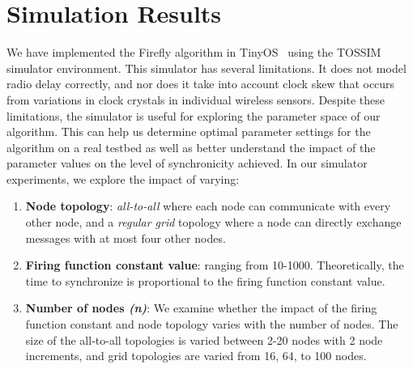 \section{Simulation Results}
\label{sec-simulations}

We have implemented the Firefly algorithm in
TinyOS~\cite{tinyos-asplos00} using the TOSSIM~\cite{tossim} simulator
environment. This simulator has several limitations.  It does not
model radio delay correctly, and nor does it take into account clock
skew that occurs from variations in clock crystals in individual
wireless sensors. Despite these limitations, the simulator is useful
for exploring the parameter space of our algorithm.  This can help us
determine optimal parameter settings for the algorithm on a real
testbed as well as better understand the impact of the parameter
values on the level of synchronicity achieved. In our simulator
experiments, we explore the impact of varying:

\begin{enumerate}\addtolength{\itemsep}{-0.5\baselineskip}
\item {\bf Node topology}: \emph{all-to-all} where each node can
communicate with every other node, and a \emph{regular grid} topology
where a node can directly exchange messages with at most four other
nodes.
\item {\bf Firing function constant value}: ranging from
10-1000. Theoretically, the time to synchronize is proportional to the
firing function constant value.
\item {\bf Number of nodes {\em (n)}}: We examine whether the impact of the
firing function constant and node topology varies with the number of
nodes. The size of the all-to-all topologies is varied between 2-20
nodes with 2 node increments, and grid topologies are varied from 16,
64, to 100 nodes.
\end{enumerate}


